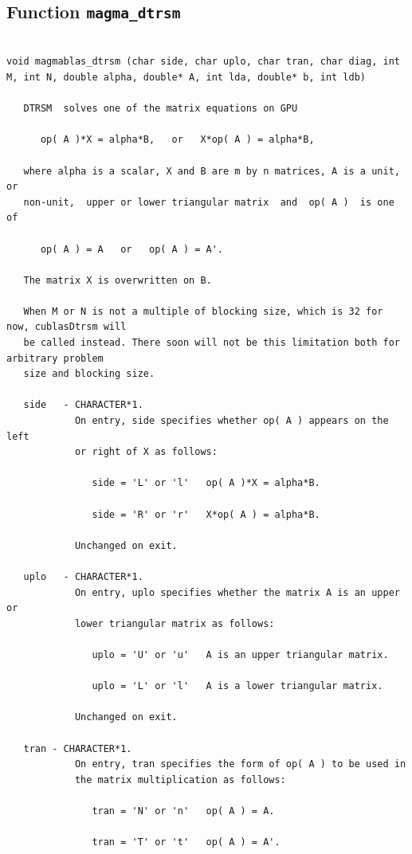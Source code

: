 \documentclass[10pt]{book}
\begin{document}
\newpage
\subsection{Function {\tt {\bf magma\_dtrsm}}}

\begin{verbatim}

void magmablas_dtrsm (char side, char uplo, char tran, char diag, int M, int N, double alpha, double* A, int lda, double* b, int ldb)

   DTRSM  solves one of the matrix equations on GPU
   
      op( A )*X = alpha*B,   or   X*op( A ) = alpha*B,
   
   where alpha is a scalar, X and B are m by n matrices, A is a unit, or
   non-unit,  upper or lower triangular matrix  and  op( A )  is one  of
   
      op( A ) = A   or   op( A ) = A'.
   
   The matrix X is overwritten on B.
   
   When M or N is not a multiple of blocking size, which is 32 for now, cublasDtrsm will
   be called instead. There soon will not be this limitation both for arbitrary problem 
   size and blocking size.
   
   side   - CHARACTER*1.
            On entry, side specifies whether op( A ) appears on the left
            or right of X as follows:
   
               side = 'L' or 'l'   op( A )*X = alpha*B.
   
               side = 'R' or 'r'   X*op( A ) = alpha*B.
   
            Unchanged on exit.
   
   uplo   - CHARACTER*1.
            On entry, uplo specifies whether the matrix A is an upper or
            lower triangular matrix as follows:
   
               uplo = 'U' or 'u'   A is an upper triangular matrix.
   
               uplo = 'L' or 'l'   A is a lower triangular matrix.
   
            Unchanged on exit.
   
   tran - CHARACTER*1.
            On entry, tran specifies the form of op( A ) to be used in
            the matrix multiplication as follows:
   
               tran = 'N' or 'n'   op( A ) = A.
   
               tran = 'T' or 't'   op( A ) = A'.
   

\end{verbatim}
\end{document}
